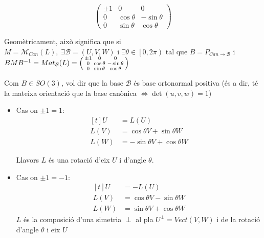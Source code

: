\documentclass[../main.tex]{subfiles}
\begin{document}
\begin{itemize}
\begin{proposicio}
\begin{displaymath}
\begin{pmatrix}
	                \pm 1 & 0 & 0\\
	                0 & \cos{\theta} & -\sin{\theta}\\
	                0 & \sin{\theta} & \cos{\theta}
	            \end{pmatrix}
	        \end{displaymath}
	    \end{proposicio}
	    Geomètricament, això significa que si $M = \mathcal{M}_{\textit{Can}} (L),\; \exists \mathcal{B} = \left(U, V, W\right)\text{ i }\exists \theta \in \left[0, 2\pi\right)$
	    tal que $B = P_{\textit{Can}\to\mathcal{B}}$ i $BMB^{-1} = Mat_\mathcal{B}(L) =
		\begin{psmallmatrix}
	        \pm 1 & 0 & 0\\
	        0 & \cos{\theta} & -\sin{\theta}\\
	        0 & \sin{\theta} & \cos{\theta}
	    \end{psmallmatrix}$

	    Com $B \in SO(3)$, vol dir que la base $\mathcal{B}$ és base ortonormal positiva (és a dir, té
	    la mateixa orientació que la base canònica $\Leftrightarrow \det{\left(u,v,w\right)} = 1$)
	    \begin{itemize}
	        \item Cas on $\pm 1 = 1$:
			\begin{displaymath}
				\begin{aligned}[t]
					U &= L(U)\\
				    L(V) &= \cos{\theta}V + \sin{\theta}W\\
				    L(W) &= -\sin{\theta}V + \cos{\theta}W
				\end{aligned}
			\end{displaymath}

	        Llavors $L$ és una rotació d'eix $U$ i d'angle $\theta$.

			\item Cas on $\pm 1 = -1$:
	        \begin{displaymath}
				\begin{aligned}[t]
					U &= -L(U)\\
				    L(V) &= \cos{\theta}V - \sin{\theta}W\\
				    L(W) &= \sin{\theta}V + \cos{\theta}W
				\end{aligned}
			\end{displaymath}
	        $L$ és la composició d'una simetria $\perp$ al pla $U^\perp = Vect(V, W)$ i de la rotació
	        d'angle $\theta$ i eix $U$
	    \end{itemize}


\end{itemize}
\end{document}
